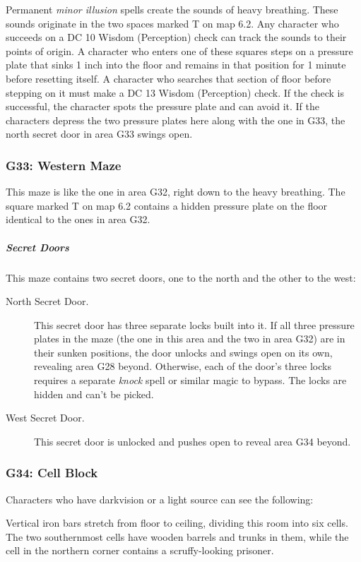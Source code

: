 \documentclass[10pt,a4paper,twoside,bg=print,twocolumn,openany,nodeprecatedcode]{dndbook}
\begin{document}
Permanent \textit{minor illusion} spells create the sounds of heavy breathing. These sounds originate in the two spaces marked T on map 6.2. Any character who succeeds on a DC 10 Wisdom (Perception) check can track the sounds to their points of origin. A character who enters one of these squares steps on a pressure plate that sinks 1 inch into the floor and remains in that position for 1 minute before resetting itself. A character who searches that section of floor before stepping on it must make a DC 13 Wisdom (Perception) check. If the check is successful, the character spots the pressure plate and can avoid it. If the characters depress the two pressure plates here along with the one in G33, the north secret door in area G33 swings open.

\subsubsection{G33: Western Maze}
This maze is like the one in area G32, right down to the heavy breathing. The square marked T on map 6.2 contains a hidden pressure plate on the floor identical to the ones in area G32.

\subparagraph{Secret Doors}
This maze contains two secret doors, one to the north and the other to the west:


\begin{description}
\item[North Secret Door.]
This secret door has three separate locks built into it. If all three pressure plates in the maze (the one in this area and the two in area G32) are in their sunken positions, the door unlocks and swings open on its own, revealing area G28 beyond. Otherwise, each of the door's three locks requires a separate \textit{knock} spell or similar magic to bypass. The locks are hidden and can't be picked.
\item[West Secret Door.]
This secret door is unlocked and pushes open to reveal area G34 beyond.
\end{description}

\subsubsection{G34: Cell Block}
Characters who have darkvision or a light source can see the following:

\begin{DndReadAloud}{}
Vertical iron bars stretch from floor to ceiling, dividing this room into six cells. The two southernmost cells have wooden barrels and trunks in them, while the cell in the northern corner contains a scruffy-looking prisoner.

\end{DndReadAloud}
\end{document}
